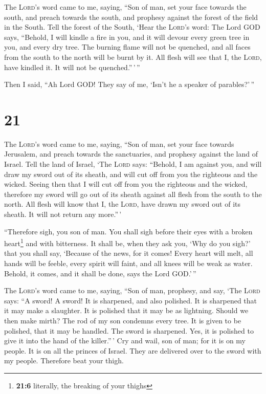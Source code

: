  The \textsc{Lord}'s word came to me, saying,
 ``Son of man, set your face towards the south, and
preach towards the south, and prophesy against the forest of the field
in the South.  Tell the forest of the South, `Hear the
\textsc{Lord}'s word: The Lord GOD says, ``Behold, I will kindle a fire
in you, and it will devour every green tree in you, and every dry tree.
The burning flame will not be quenched, and all faces from the south to
the north will be burnt by it.  All flesh will see that
I, the \textsc{Lord}, have kindled it. It will not be quenched.''\,'\,''

 Then I said, ``Ah Lord GOD! They say of me, `Isn't he a
speaker of parables?'\,''

\hypertarget{section-20}{%
\section{21}\label{section-20}}

 The \textsc{Lord}'s word came to me, saying,
 ``Son of man, set your face towards Jerusalem, and preach
towards the sanctuaries, and prophesy against the land of Israel.
 Tell the land of Israel, `The \textsc{Lord} says:
``Behold, I am against you, and will draw my sword out of its sheath,
and will cut off from you the righteous and the wicked. 
Seeing then that I will cut off from you the righteous and the wicked,
therefore my sword will go out of its sheath against all flesh from the
south to the north.  All flesh will know that I, the
\textsc{Lord}, have drawn my sword out of its sheath. It will not return
any more.''\,'

 ``Therefore sigh, you son of man. You shall sigh before
their eyes with a broken heart\footnote{\textbf{21:6} literally, the
  breaking of your thighs} and with bitterness.  It shall
be, when they ask you, `Why do you sigh?' that you shall say, `Because
of the news, for it comes! Every heart will melt, all hands will be
feeble, every spirit will faint, and all knees will be weak as water.
Behold, it comes, and it shall be done, says the Lord GOD.'\,''

 The \textsc{Lord}'s word came to me, saying,
 ``Son of man, prophesy, and say, `The \textsc{Lord} says:
``A sword! A sword! It is sharpened, and also polished. 
It is sharpened that it may make a slaughter. It is polished that it may
be as lightning. Should we then make mirth? The rod of my son condemns
every tree.  It is given to be polished, that it may be
handled. The sword is sharpened. Yes, it is polished to give it into the
hand of the killer.''\,'  Cry and wail, son of man; for
it is on my people. It is on all the princes of Israel. They are
delivered over to the sword with my people. Therefore beat your thigh.


